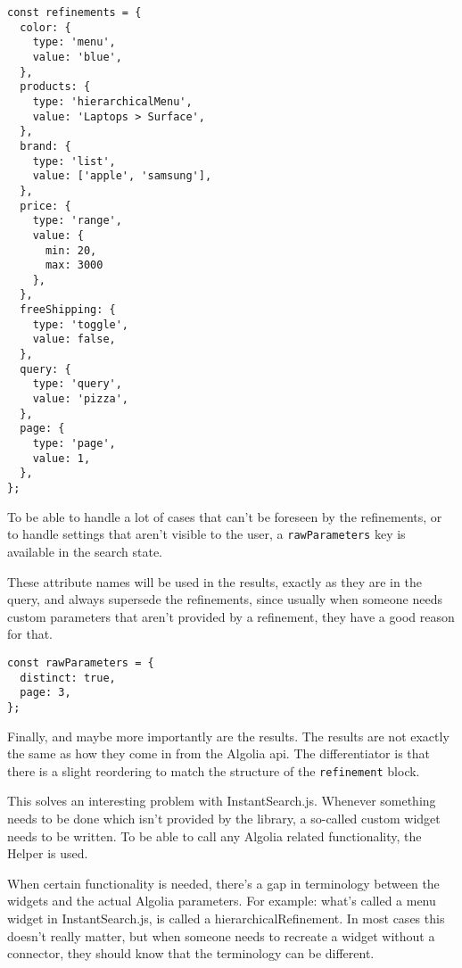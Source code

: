 \begin{minipage}{\linewidth}
\begin{lstlisting}[caption={\Glspl{refinement} in InstantSearch Core},label={lst:is-core-state-2}]
const refinements = {
  color: {
    type: 'menu',
    value: 'blue',
  },
  products: {
    type: 'hierarchicalMenu',
    value: 'Laptops > Surface',
  },
  brand: {
    type: 'list',
    value: ['apple', 'samsung'],
  },
  price: {
    type: 'range',
    value: {
      min: 20,
      max: 3000
    },
  },
  freeShipping: {
    type: 'toggle',
    value: false,
  },
  query: {
    type: 'query',
    value: 'pizza',
  },
  page: {
    type: 'page',
    value: 1,
  },
};
\end{lstlisting}
\end{minipage}

To be able to handle a lot of cases that can't be foreseen by the \glspl{refinement}, or to handle settings that aren't visible to the user, a {\tt rawParameters} key is available in the search state. 

These \gls{attribute} names will be used in the results, exactly as they are in the query, and always supersede the \glspl{refinement}, since usually when someone needs custom parameters that aren't provided by a refinement, they have a good reason for that.

\begin{minipage}{\linewidth}
\begin{lstlisting}[caption={Passing raw Algolia parameters to InstantSearch Core},label={lst:is-core-state-3}]
const rawParameters = {
  distinct: true,
  page: 3,
};
\end{lstlisting}
\end{minipage}

Finally, and maybe more importantly are the results. The results are not exactly the same as how they come in from the Algolia \acrshort{api}. The differentiator is that there is a slight reordering to match the structure of the {\tt refinement} block.

This solves an interesting problem with InstantSearch.js. Whenever something needs to be done which isn't provided by the \gls{library}, a so-called custom widget needs to be written. To be able to call any Algolia related functionality, the Helper is used. 

When certain functionality is needed, there's a gap in terminology between the widgets and the actual Algolia parameters. For example: what's called a menu widget in InstantSearch.js, is called a hierarchicalRefinement. In most cases this doesn't really matter, but when someone needs to recreate a widget without a connector, they should know that the terminology can be different.

